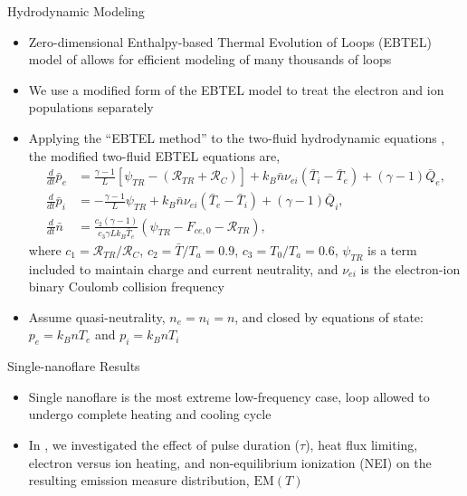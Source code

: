 \documentclass[final]{beamer}
\begin{document}
\begin{frame}
\begin{columns}[T]
\begin{column}{0.49\linewidth}
\begin{block}{Hydrodynamic Modeling}
\begin{itemize}
        \item Zero-dimensional Enthalpy-based Thermal Evolution of Loops (EBTEL) model of \citet{klimchuk_highly_2008,cargill_enthalpy-based_2012} allows for efficient modeling of many thousands of loops
        \item We use a modified form of the EBTEL model to treat the electron and ion populations separately \citep[for more details, see][submitted]{barnes_inference_2016}
        \item Applying the ``EBTEL method'' to the two-fluid hydrodynamic equations \citep[as given in][]{bradshaw_influence_2013}, the modified two-fluid EBTEL equations are,
        \begin{align}
          \frac{d}{dt}\bar{p}_e &= \frac{\gamma - 1}{L}\left\lbrack\psi_{TR} - (\mathcal{R}_{TR} + \mathcal{R}_C)\right\rbrack + k_B\bar{n}\nu_{ei}(\bar{T}_i - \bar{T}_e) + (\gamma - 1)\bar{Q}_e,\label{eq:ebtel_pe} \\[0.5em]
		      \frac{d}{dt}\bar{p}_i &= -\frac{\gamma - 1}{L}\psi_{TR} + k_B\bar{n}\nu_{ei}(\bar{T}_e - \bar{T}_i) + (\gamma - 1)\bar{Q}_i,\label{eq:ebtel_pi}\\[0.5em]
		      \frac{d}{dt}\bar{n} &= \frac{c_2(\gamma - 1)}{c_3\gamma Lk_B\bar{T}_e}\left(\psi_{TR} - F_{ce,0} - \mathcal{R}_{TR}\right),\label{eq:ebtel_n}
        \end{align}
        where $c_1=\mathcal{R}_{TR}/\mathcal{R}_C$, $c_2=\bar{T}/T_a=0.9$, $c_3=T_0/T_a=0.6$, $\psi_{TR}$ is a term included to maintain charge and current neutrality, and $\nu_{ei}$ is the electron-ion binary Coulomb collision frequency
        \item Assume quasi-neutrality, $n_e=n_i=n$, and closed by equations of state: $p_e=k_BnT_e$ and $p_i=k_BnT_i$
      \end{itemize}
    \end{block}
    \begin{block}{Single-nanoflare Results}
      \vspace{-1ex}
      \begin{itemize}
        \item Single nanoflare is the most extreme low-frequency case, loop allowed to undergo complete heating and cooling cycle
        \item In \citet[submitted]{barnes_inference_2016}, we investigated the effect of pulse duration ($\tau$), heat flux limiting, electron versus ion heating, and non-equilibrium ionization (NEI) on the resulting emission measure distribution, $\mathrm{EM}(T)$

\end{itemize}
\end{block}
\end{column}
\end{columns}
\end{frame}
\end{document}
